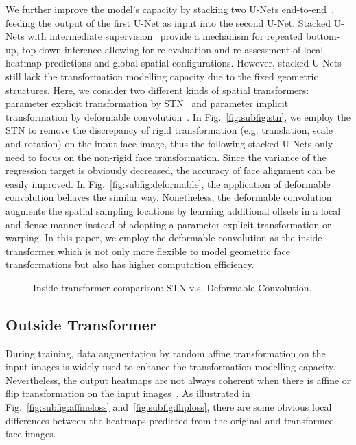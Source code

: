 \documentclass{bmvc2k}
\begin{document}
We further improve the model's capacity by stacking two U-Nets end-to-end~\cite{newell2016stacked,bulat2017far}, feeding the output of the first U-Net as input into the second U-Net. Stacked U-Nets with intermediate supervision~\cite{newell2016stacked} provide a mechanism for repeated bottom-up, top-down inference allowing for re-evaluation and re-assessment of local heatmap predictions and global spatial configurations. However, stacked U-Nets still lack the transformation modelling capacity due to the fixed geometric structures. Here, we consider two different kinds of spatial transformers: parameter explicit transformation by STN~\cite{jaderberg2015spatial} and parameter implicit transformation by deformable convolution~\cite{dai2017deformable}. In Fig.~\ref{fig:subfig:stn}, we employ the STN to remove the discrepancy of rigid transformation (e.g. translation, scale and rotation) on the input face image, thus the following stacked U-Nets only need to focus on the non-rigid face transformation. Since the variance of the regression target is obviously decreased, the accuracy of face alignment can be easily improved. In Fig.~\ref{fig:subfig:deformable}, the application of deformable convolution behaves the similar way. Nonetheless, the deformable convolution augments the spatial sampling locations by learning additional offsets in a local and dense manner instead of adopting a parameter explicit transformation or warping. In this paper, we employ the deformable convolution as the inside transformer which is not only more flexible to model geometric face transformations but also has higher computation efficiency.

\begin{figure*}[h!]
\centering
{}
\caption{Inside transformer comparison: STN v.s. Deformable Convolution.}
\vspace{-4mm}
\label{fig:deformable}
\end{figure*}



\subsection{Outside Transformer}

During training, data augmentation by random affine transformation on the input images is widely used to enhance the transformation modelling capacity. Nevertheless, the output heatmaps are not always coherent when there is affine or flip transformation on the input images~\cite{honari2017improving,yang2015mirror}. As illustrated in Fig.~\ref{fig:subfig:affineloss} and~\ref{fig:subfig:fliploss}, there are some obvious local differences between the heatmaps predicted from the original and transformed face images. 
\end{document}
